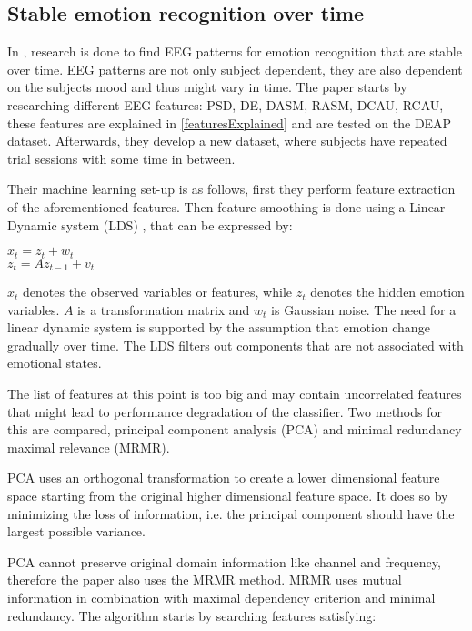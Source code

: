 \subsection{Stable emotion recognition over time}

In \citep{killyPaper}, research is done to find EEG patterns for emotion recognition that are stable over time. EEG patterns are not only subject dependent, they are also dependent on the subjects mood and thus might vary in time. The paper starts by researching different EEG features: PSD, DE, DASM, RASM, DCAU, RCAU, these features are explained in \ref{featuresExplained} and are tested on the DEAP dataset. Afterwards, they develop a new dataset, where subjects have repeated trial sessions with some time in between.

\npar

Their machine learning set-up is as follows, first they perform feature extraction of the aforementioned features. Then feature smoothing is done using a Linear Dynamic system (LDS) , that can be expressed by:
\begin{center}
$x_t = z_t + w_t$\\
$z_t = Az_{t-1} + v_t$
\end{center}
$x_t$ denotes the observed variables or features, while $z_t$ denotes the hidden emotion variables. $A$ is a transformation matrix and $w_t$ is Gaussian noise. The need for a linear dynamic system is supported by the assumption that emotion change gradually over time. The LDS filters out components that are not associated with emotional states.

\npar

The list of features at this point is too big and may contain uncorrelated features that might lead to performance degradation of the classifier. Two methods for this are compared, principal component analysis (PCA) and minimal redundancy maximal relevance (MRMR). 

\npar

PCA uses an orthogonal transformation to create a lower dimensional feature space starting from the original higher dimensional feature space. It does so by minimizing the loss of information, i.e. the principal component should have the largest possible variance. 

\npar

PCA cannot preserve original domain information like channel and frequency, therefore the paper also uses the MRMR method. MRMR uses mutual information in combination with maximal dependency criterion and minimal redundancy. The algorithm starts by searching features satisfying:


